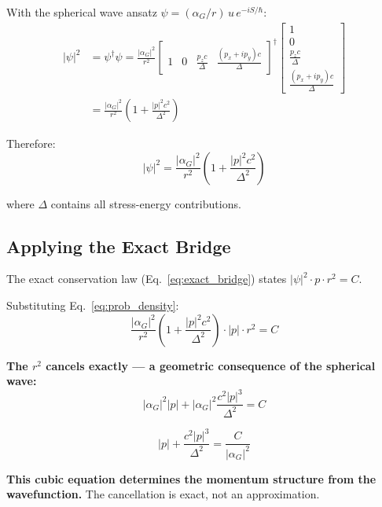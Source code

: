 \documentclass[11pt,a4paper]{article}
\theoremstyle{definition}
\theoremstyle{remark}
\begin{document}
	With the spherical wave ansatz $\psi = (\alpha_G/r)\,u\,e^{-iS/\hbar}$:
	\begin{align}
		|\psi|^2 &= \psi^\dagger\psi
		= \frac{|\alpha_G|^2}{r^2}\begin{bmatrix}1&0&\frac{p_zc}{\Delta}&\frac{(p_x+ip_y)c}{\Delta}\end{bmatrix}^\dagger
		\begin{bmatrix}1\\0\\\frac{p_zc}{\Delta}\\\frac{(p_x+ip_y)c}{\Delta}\end{bmatrix} \\
		&= \frac{|\alpha_G|^2}{r^2}\!\left(1 + \frac{|p|^2 c^2}{\Delta^2}\right)
	\end{align}
	
	Therefore:
	\begin{equation}
		\boxed{|\psi|^2 = \frac{|\alpha_G|^2}{r^2}\!\left(1 + \frac{|p|^2 c^2}{\Delta^2}\right)}
		\label{eq:prob_density}
	\end{equation}
	
	where $\Delta$ contains all stress-energy contributions.
	
	\subsection{Applying the Exact Bridge}
	
	The exact conservation law (Eq.~\eqref{eq:exact_bridge}) states $|\psi|^2 \cdot p \cdot r^2 = C$.
	
	Substituting Eq.~\eqref{eq:prob_density}:
	\begin{equation}
		\frac{|\alpha_G|^2}{r^2}\!\left(1+\frac{|p|^2 c^2}{\Delta^2}\right)\cdot|p|\cdot r^2 = C
		\label{eq:momentum_equation}
	\end{equation}
	
	\textbf{The $r^2$ cancels exactly --- a geometric consequence of the spherical wave:}
	\begin{equation}
		|\alpha_G|^2|p| + |\alpha_G|^2\frac{c^2|p|^3}{\Delta^2} = C
	\end{equation}
	
	\begin{equation}
		\boxed{|p| + \frac{c^2|p|^3}{\Delta^2} = \frac{C}{|\alpha_G|^2}}
		\label{eq:cubic}
	\end{equation}
	
	\textbf{This cubic equation determines the momentum structure from the wavefunction.}  The cancellation is exact, not an approximation.
	
\end{document}
